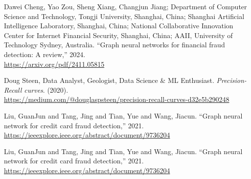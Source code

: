 \documentclass[conference]{IEEEtran}
\begin{document}
\begin{thebibliography}{99}
Dawei Cheng, Yao Zou, Sheng Xiang, Changjun Jiang; Department of Computer Science and Technology, Tongji University, Shanghai, China; Shanghai Artificial Intelligence Laboratory, Shanghai, China; National Collaborative Innovation Center for Internet Financial Security, Shanghai, China; AAII, University of Technology Sydney, Australia. ``Graph neural networks for financial fraud detection: A review,'' 2024.\\
\href{https://arxiv.org/pdf/2411.05815}{https://arxiv.org/pdf/2411.05815}


Doug Steen, Data Analyst, Geologist, Data Science \& ML Enthusiast. \textit{Precision-Recall curves}. (2020).\\
\url{https://medium.com/@douglaspsteen/precision-recall-curves-d32e5b290248}


Liu, GuanJun and Tang, Jing and Tian, Yue and Wang, Jiacun. ``Graph neural network for credit card fraud detection,'' 2021.\\
\href{https://ieeexplore.ieee.org/abstract/document/9736204}{https://ieeexplore.ieee.org/abstract/document/9736204}


Liu, GuanJun and Tang, Jing and Tian, Yue and Wang, Jiacun. ``Graph neural network for credit card fraud detection,'' 2021.\\
\href{https://ieeexplore.ieee.org/abstract/document/9736204}{https://ieeexplore.ieee.org/abstract/document/9736204}


\end{thebibliography}
\end{document}
